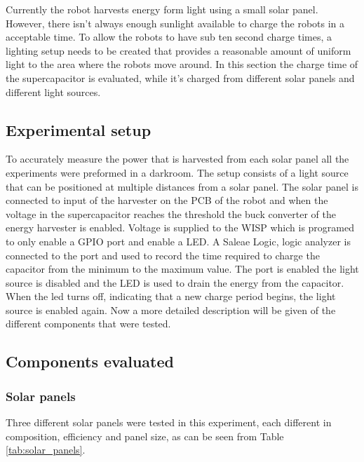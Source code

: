Currently the robot harvests energy form light using a small solar panel.
However, there isn't always enough sunlight available to charge the robots in a acceptable time.
To allow the robots to have sub ten second charge times, a lighting setup needs to be created that provides a reasonable amount of uniform light to the area where the robots move around.
In this section the charge time of the supercapacitor is evaluated, while it's charged from different solar panels and different light sources.

\subsection{Experimental setup}
To accurately measure the power that is harvested from each solar panel all the experiments were preformed in a darkroom.
The setup consists of a light source that can be positioned at multiple distances from a solar panel.
The solar panel is connected to input of the harvester on the PCB of the robot and when the voltage in the supercapacitor reaches the threshold the buck converter of the energy harvester is enabled.
Voltage is supplied to the WISP which is programed to only enable a GPIO port and enable a LED.
A Saleae Logic, logic analyzer is connected to the port and used to record the time required to charge the capacitor from the minimum to the maximum value.
The port is enabled the light source is disabled and the LED is used to drain the energy from the capacitor.
When the led turns off, indicating that a new charge period begins, the light source is enabled again.
Now a more detailed description will be given of the different components that were tested.

\subsection{Components evaluated}

\subsubsection{Solar panels}
Three different solar panels were tested in this experiment, each different in composition, efficiency and panel size, as can be seen from Table \ref{tab:solar_panels}.

